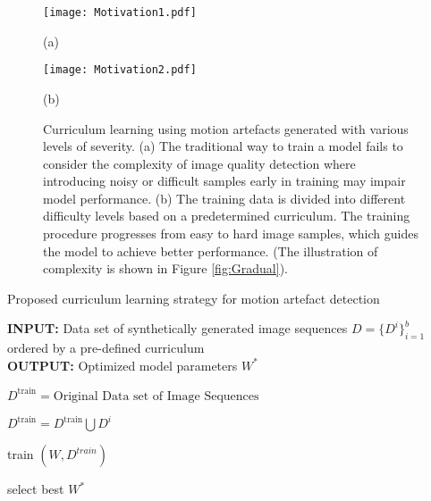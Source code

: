 \documentclass[preprint,12pt,authoryear]{elsarticle}
\begin{document}
 \begin{figure}[tb]

\begin{minipage}[b]{0.38\linewidth}
  \centering
  \centerline{\texttt{[image: Motivation1.pdf]}}
  \centerline{(a)}\medskip
\end{minipage}
\hfill
\begin{minipage}[b]{0.57\linewidth}
  \centering
  \centerline{\texttt{[image: Motivation2.pdf]}}
  \centerline{(b)}\medskip
\end{minipage}
%
\hfill


\caption{Curriculum learning using motion artefacts generated with various levels of severity. (a) The  traditional  way  to  train  a  model  fails  to consider  the  complexity  of  image quality detection  where  introducing  noisy  or  difficult  samples  early  in  training  may impair model performance. (b) The training data is divided into  different  difficulty  levels  based  on  a  predetermined curriculum. The training procedure progresses from easy to hard image  samples, which guides the model to achieve better performance.  (The  illustration  of  complexity  is  shown  in Figure \ref{fig:Gradual}).}
\label{fig:MotivationCur}
%
\end{figure}






\begin{algorithm}[t]
\caption{Proposed curriculum learning strategy for motion artefact detection}\label{alg:algo1}


\begin{flushleft}
        \textbf{INPUT:}  Data set of synthetically generated image sequences $D=\{ D^{i}\}^{b}_{i=1} $ ordered by a pre-defined curriculum \\
        \textbf{OUTPUT:} Optimized model parameters $W^{*}$
\end{flushleft}


\begin{algorithmic}[1]

\State $D^{\text{train}}= \text{Original Data set of Image Sequences}$


\State $D^{\text{train}}=D^{\text{train}} \bigcup D^{i}$


\State train $(W, D^{train})$
\EndFor

\State select best  $W^{*}$
\EndFor


\end{algorithmic}
\end{algorithm}
\end{document}

